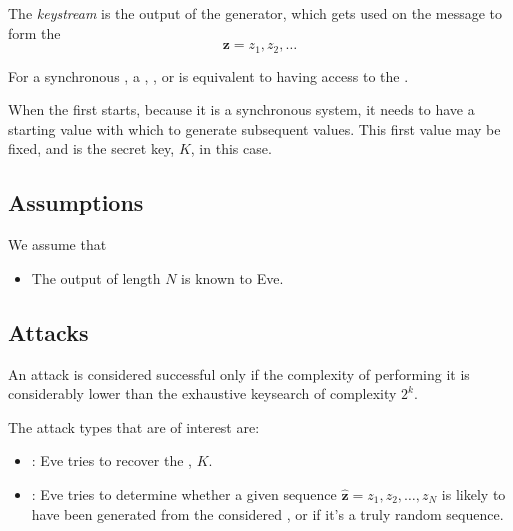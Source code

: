 \begin{definition}[Keystream]\label{def:Keystream}
  The \emph{keystream} is the output of the generator, which gets used on the  message to form the 
  \begin{equation}\label{eq:Keystream}
    \mathbf{z} = z_{1}, z_{2}, \ldots
  \end{equation}

  \begin{remark}[Attacks]\label{rmk:Keystream_Attack_Vectors}
    For a synchronous , a , , or  is equivalent to having access to the .
  \end{remark}

  \begin{remark}\label{rmk:Keystream_Secret_Key}
    When the  first starts, because it is a synchronous system, it needs to have a starting value with which to generate subsequent values.
    This first value may be fixed, and is the secret key, $K$, in this case.
  \end{remark}
\end{definition}

\subsection{Assumptions}\label{subsec:Stream_Cipher_Assumptions}
We assume that
\begin{itemize}[noitemsep]
\item The output  of length $N$ is known to Eve.
\end{itemize}

\subsection{Attacks}\label{subsec:Stream_Cipher_Attacks}
An attack is considered successful only if the complexity of performing it is considerably lower than the exhaustive keysearch of complexity $2^{k}$.

The attack types that are of interest are:
\begin{itemize}[noitemsep]
\item \emph{}: Eve tries to recover the , $K$.
\item \emph{}: Eve tries to determine whether a given sequence $\hat{\mathbf{z}} = z_{1}, z_{2}, \ldots, z_{N}$ is likely to have been generated from the considered , or if it's a truly random sequence.
\end{itemize}

